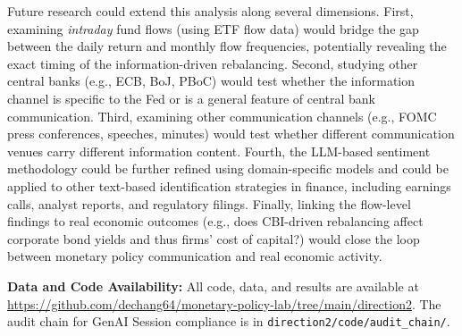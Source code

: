 \documentclass[11pt,a4paper]{article}
\begin{document}
Future research could extend this analysis along several dimensions. First, examining \textit{intraday} fund flows (using ETF flow data) would bridge the gap between the daily return and monthly flow frequencies, potentially revealing the exact timing of the information-driven rebalancing. Second, studying other central banks (e.g., ECB, BoJ, PBoC) would test whether the information channel is specific to the Fed or is a general feature of central bank communication. Third, examining other communication channels (e.g., FOMC press conferences, speeches, minutes) would test whether different communication venues carry different information content. Fourth, the LLM-based sentiment methodology could be further refined using domain-specific models \citep{BIS2024cblms} and could be applied to other text-based identification strategies in finance, including earnings calls, analyst reports, and regulatory filings. Finally, linking the flow-level findings to real economic outcomes (e.g., does CBI-driven rebalancing affect corporate bond yields and thus firms' cost of capital?) would close the loop between monetary policy communication and real economic activity.

\textbf{Data and Code Availability:} All code, data, and results are available at \url{https://github.com/dechang64/monetary-policy-lab/tree/main/direction2}. The audit chain for GenAI Session compliance is in \texttt{direction2/code/audit\_chain/}.
\end{document}
